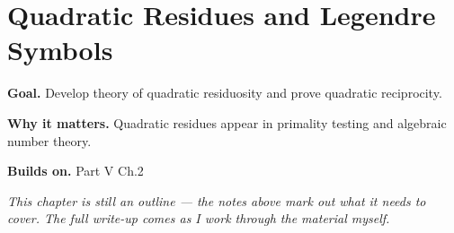 \chapter{Quadratic Residues and Legendre Symbols}
\label{ch:05-number-theory-08}

\begin{chapterintro}
\textbf{Goal.} Develop theory of quadratic residuosity and prove quadratic reciprocity.

\textbf{Why it matters.} Quadratic residues appear in primality testing and algebraic number theory.

\textbf{Builds on.} Part V Ch.2
\end{chapterintro}

\textit{This chapter is still an outline --- the notes above mark out what it needs to cover. The full write-up comes as I work through the material myself.}
